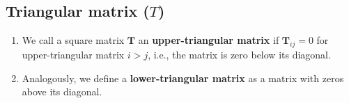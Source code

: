 \subsection{Triangular matrix ($T$)}

\begin{enumerate}
    \item We call a square matrix $\bm{T}$ an \textbf{upper-triangular matrix} if $\bm{T}_{ij} = 0$ for upper-triangular matrix $i > j$, i.e., the matrix is zero below its diagonal.
    \hfill \cite{mfml/book/mml/Deisenroth-Faisal-Ong}

    \item Analogously, we define a \textbf{lower-triangular matrix} as a matrix with zeros above its diagonal.
    \hfill \cite{mfml/book/mml/Deisenroth-Faisal-Ong}
\end{enumerate}





